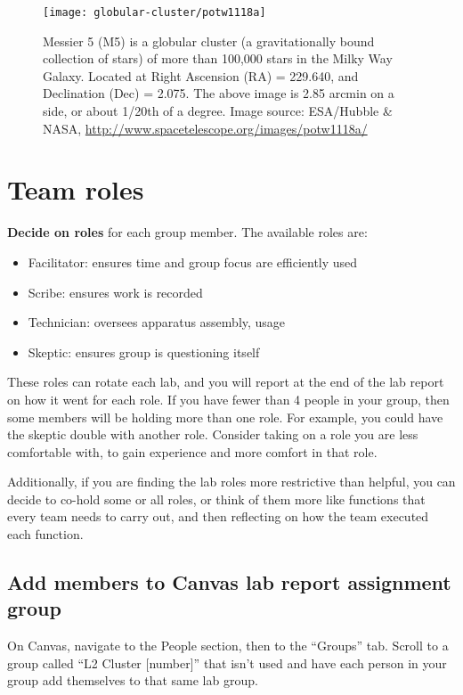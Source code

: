 \begin{figure}
	\centering
	\texttt{[image: globular-cluster/potw1118a]}
	\caption{Messier 5 (M5) is a globular cluster (a gravitationally bound collection
		of stars) of more than 100,000 stars in the Milky Way Galaxy. Located at Right
		Ascension (RA) = 229.640\textdegree, and Declination (Dec) = 2.075\textdegree.
		The above
		image is 2.85 arcmin on a side, or about 1/20th of a degree.
		Image source: ESA/Hubble \& NASA, \url{http://www.spacetelescope.org/images/potw1118a/}}\label{gc:fig:m5}
\end{figure}

\section{Team roles}

\textbf{Decide on roles} for each group member. The available roles are:

\begin{itemize}
	\item Facilitator: ensures time and group focus are efficiently used
	\item Scribe: ensures work is recorded
	\item Technician: oversees apparatus assembly, usage
	\item Skeptic: ensures group is questioning itself
\end{itemize}

These roles can rotate each lab, and you will report at the end of the lab report on how it went for each role. If you have fewer than 4 people in your group, then some members will be holding more than one role. For example, you could have the skeptic double with another role. Consider taking on a role you are less comfortable with, to gain experience and more comfort in that role.

Additionally, if you are finding the lab roles more restrictive than helpful, you can decide to co-hold some or all roles, or think of them more like functions that every team needs to carry out, and then reflecting on how the team executed each function.

\subsection{Add members to Canvas lab report assignment group}

\begin{steps}
	\item On Canvas, navigate to the People section, then to the ``Groups'' tab. Scroll to a group called ``L2 Cluster [number]'' that isn't used and have each person in your group add themselves to that same lab group.
\end{steps}

